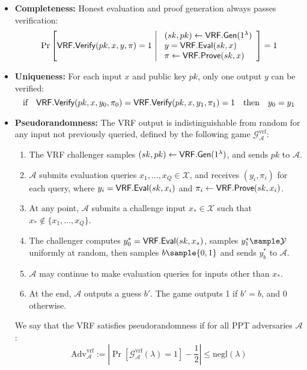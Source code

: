 \begin{itemize}
    \item \textbf{Completeness:} Honest evaluation and proof generation always passes verification:
    \[
    \Pr\left[ \VRFVerify(pk,x,y,\pi) = 1 \ \middle| \ 
    \begin{array}{l}
        (sk, pk) \leftarrow \VRFGen(1^\lambda) \\
        y = \VRFEval(sk,x) \\
        \pi \leftarrow \VRFProve(sk,x)
    \end{array}
    \right] = 1
    \]
    
    \item \textbf{Uniqueness:} For each input $x$ and public key $pk$, only one output $y$ can be verified:
    \[
    \text{if} \quad \mathsf{VRF.Verify}(pk, x, y_0, \pi_0) = \mathsf{VRF.Verify}(pk, x, y_1, \pi_1) = 1 \quad \text{then} \quad y_0 = y_1
    \]
    
    \item \textbf{Pseudorandomness:} The VRF output is indistinguishable from random for any input not previously queried, defined by the following game $\mathcal{G}_{\mathcal{A}}^{\text{vrf}}$:
    \begin{enumerate}
        \item The VRF challenger samples $(sk, pk) \leftarrow \mathsf{VRF.Gen}(1^\lambda)$, and sends $pk$ to $\mathcal{A}$.
        \item $\mathcal{A}$ submits evaluation queries $x_1, \ldots, x_Q \in \mathcal{X}$, and receives $(y_i, \pi_i)$ for each query, where $y_i = \mathsf{VRF.Eval}(sk, x_i)$ and $\pi_i \leftarrow \mathsf{VRF.Prove}(sk, x_i)$.
        \item At any point, $\mathcal{A}$ submits a challenge input $x_* \in \mathcal{X}$ such that $x_* \not\in \{x_1, \ldots, x_Q\}$.
        \item The challenger computes $y_0^* = \mathsf{VRF.Eval}(sk, x_*)$, samples $y_1^* \sample \mathcal{Y}$ uniformly at random, then samples $b \sample \{0,1\}$ and sends $y_b^*$ to $\mathcal{A}$.
        \item $\mathcal{A}$ may continue to make evaluation queries for inputs other than $x_*$.
        \item At the end, $\mathcal{A}$ outputs a guess $b'$. The game outputs 1 if $b' = b$, and 0 otherwise.
    \end{enumerate}
    
    We say that the VRF satisfies pseudorandomness if for all PPT adversaries $\mathcal{A}$:
    \[
    \text{Adv}_{\mathcal{A}}^{\text{vrf}} := \left|\Pr\left[\mathcal{G}_{\mathcal{A}}^{\text{vrf}}(\lambda) = 1\right] - \frac{1}{2}\right| \leq \text{negl}(\lambda)
    \]
\end{itemize}


